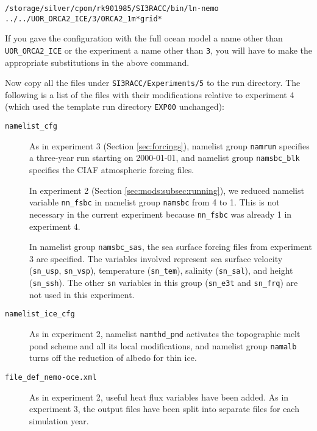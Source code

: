 \begin{verbatim}
/storage/silver/cpom/rk901985/SI3RACC/bin/ln-nemo ../../UOR_ORCA2_ICE/3/ORCA2_1m*grid*
\end{verbatim}

\noindent{}If you gave the configuration with the full ocean model a name other than \verb|UOR_ORCA2_ICE| or the experiment a name other than \verb|3|, you will have to make the appropriate substitutions in the above command.

Now copy all the files under \verb|SI3RACC/Experiments/5| to the run directory.
The following is a list of the files with their modifications relative to experiment 4 (which used the template run directory \verb|EXP00| unchanged):

\begin{description}

    \item[\texttt{namelist\_cfg}]
        As in experiment 3 (Section \ref{sec:forcings}), namelist group \verb|namrun| specifies a three-year run starting on 2000-01-01, and namelist group \verb|namsbc_blk| specifies the CIAF atmospheric forcing files.
    
        In experiment 2 (Section \ref{sec:mods:subsec:running}), we reduced namelist variable \verb|nn_fsbc| in namelist group \verb|namsbc| from 4 to 1.
        This is not necessary in the current experiment because \verb|nn_fsbc| was already 1 in experiment 4.
    
        In namelist group \verb|namsbc_sas|, the sea surface forcing files from experiment 3 are specified.
        The variables involved represent sea surface velocity (\verb|sn_usp|, \verb|sn_vsp|), temperature (\verb|sn_tem|), salinity (\verb|sn_sal|), and height (\verb|sn_ssh|).
        The other \verb|sn| variables in this group (\verb|sn_e3t| and \verb|sn_frq|) are not used in this experiment.

    \item[\texttt{namelist\_ice\_cfg}]
        As in experiment 2, namelist \verb|namthd_pnd| activates the topographic melt pond scheme and all its local modifications, and namelist group \verb|namalb| turns off the reduction of albedo for thin ice.

    \item[\texttt{file\_def\_nemo-oce.xml}]
        As in experiment 2, useful heat flux variables have been added.
        As in experiment 3, the output files have been split into separate files for each simulation year.


\end{description}

